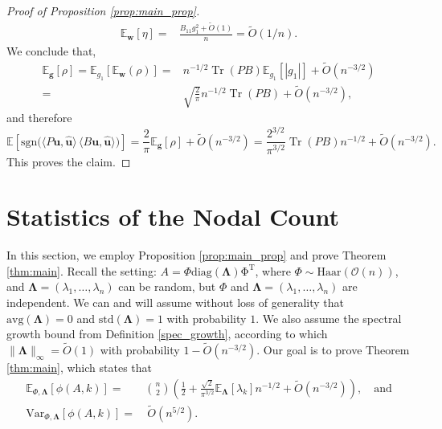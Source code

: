 \documentclass[reqno]{amsart}
\numberwithin{equation}{section}
\newcommand\E{\mathbb{E}}
\newcommand\bg{\bm{g}}
\newcommand\bw{\bm{w}}
\newcommand\rem{\tilde{O}\left(n^{-3/2}\right)}
\newcommand\bu{\bm{u}}
\newcommand\hu{\hat{\bm u}}
\newcommand\Tr{{\operatorname{Tr}}}
\newcommand{\av}{\mathrm{avg}}
\newcommand{\std}{\mathrm{std}}
\newcommand{\Var}{\mathrm{Var}}
\begin{document}
\begin{proof}[Proof of Proposition \ref{prop:main_prop}]
\begin{align*}
\E_{\bw}[\eta]=& \frac{B_{11}g_{1}^2+\tilde{O}(1)}{n}=\tilde{O}(1/n).
\end{align*}
We conclude that,
\begin{align*}
\E_{\bg}[\rho]=\E_{g_{1}}\left[\E_{\bw}(\rho)\right]= & n^{-1/2}\Tr(PB)\E_{g_{1}}\left[|g_{1}|\right]+\rem\\ = & \sqrt{\frac{2}{\pi}}n^{-1/2}\Tr(PB)+\rem,  
\end{align*}
and therefore
\begin{equation*}
 \E\!\left[\mathrm{sgn}\!\big(\langle P\bu,\hu\rangle\,
\langle B\bu,\hu\rangle\big)\right]
=  \frac{2}{\pi}\E_{\bg}[\rho]+\rem
= \frac{2^{3/2}}{\pi^{3/2}}\Tr(PB)n^{-1/2}+\rem. 
\end{equation*}
This proves the claim.
\end{proof}



\section{Statistics of the Nodal Count}
In this section, we employ Proposition \ref{prop:main_prop} and prove Theorem \ref{thm:main}. Recall the setting:  $A=\Phi\mathrm{diag(\bm\Lambda)\Phi^T}$, where $\Phi \sim \mathrm{Haar}(\mathcal{O}(n))$, and $\bm{\Lambda}=(\lambda_{1},\ldots,\lambda_{n})$ can be random, but $\Phi$ and $\bm{\Lambda}=(\lambda_{1},\ldots,\lambda_{n})$ are independent. We can and will assume without loss of generality that $\av(\bm\Lambda)=0$ and $\std(\bm\Lambda)=1$ with probability $1$. We also assume the spectral growth bound from Definition \ref{spec_growth}, according to which $\|\bm\Lambda\|_{\infty}=\tilde{O}(1)$ with probability $1-\rem$. Our goal is to prove Theorem \ref{thm:main}, which states that 
\begin{align}
    \E_{\Phi,\bm\Lambda}[\phi(A,k)]= & { n \choose 2}\left(\frac{1}{2}+\frac{\sqrt{2}}{\pi^{3/2}}\E_{\bm\Lambda}[\lambda_{k}]n^{-1/2}+\rem\right),\quad\text{and}\\
    \Var_{\Phi,\bm\Lambda}[\phi(A,k)]= &\ \tilde{O}(n^{5/2}).
\end{align}
\end{document}
